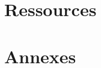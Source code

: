 \documentclass{backend}
\begin{document}






\backmatter %

\part{Ressources}
\nocite{*}

\printbibliography

\printindex

\renewcommand\listoflistingscaption{Listes des codes}
\listoffigures
\listoflistings
\listoftables


\part*{Annexes}

\appendix

\end{document}
